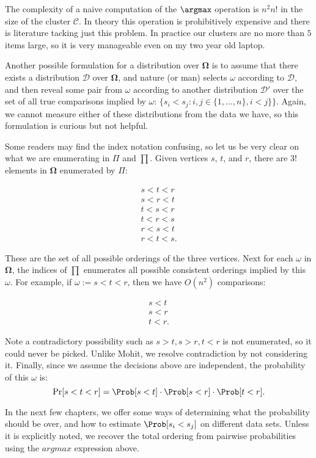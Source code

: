 \begin{remark}
The complexity of a naive computation of the $\argmax$ operation is $n^2 n!$ in the size of the cluster $\mathcal{C}.$ In theory this operation is prohibitively expensive and there is literature tacking just this problem. In practice our clusters are no more than $5$ items large, so it is very manageable even on my two year old laptop. 
\end{remark}

\begin{remark}
Another possible formulation for a distribution over $\pmb{\Omega}$ is to assume that there exists a distribution $\mathcal{D}$ over $\pmb{\Omega}$, and nature (or man) selects $\omega$ according to $\mathcal{D}$, and then reveal some pair from $\omega$ according to another distribution $\mathcal{D}'$ over the set of all true comparisons implied by $\omega$: $\{s_i < s_j : i,j \in \{1,\ldots, n\}, i < j\}\}$. Again, we cannot measure either of these distributions from the data we have, so this formulation is curious but not helpful.
\end{remark}

\begin{remark}
Some readers may find the index notation confusing, so let us be very clear on what we are enumerating in $\Pi$ and $\prod$. Given vertices $s$, $t$, and $r$, there are $3!$ elements in $\pmb{\Omega}$ enumerated by $\Pi$:

\begin{align*}
	s < t < r \\
	s < r < t \\
	t < s < r \\
	t < r < s \\
	r < s < t \\
	r < t < s.
\end{align*}

These are the set of all possible orderings of the three vertices. Next for each $\omega$ in $\pmb{\Omega}$, the indices of $\prod$ enumerates all possible consistent orderings implied by this $\omega$. For example, if $\omega := s < t < r$, then we have $O(n^2)$ comparisons:

\begin{align*}
	s < t \\
	s < r \\
	t < r.
\end{align*}

Note a contradictory possibility such as $s > t, s > r, t < r$ is not enumerated, so it could never be picked. Unlike Mohit, we resolve contradiction by not considering it. Finally, since we assume the decisions above are independent, the probability of this $\omega$ is:
\[
	\Pr[ s < t < r] = \Prob[s < t] \cdot \Prob[s < r] \cdot \Prob [t < r].
\]
\end{remark}


In the next few chapters, we offer some ways of determining what the probability should be over, and how to estimate $\Prob[ s_i < s_j ]$ on different data sets.  Unless it is explicitly noted, we recover the total ordering from pairwise probabilities using the $argmax$ expression above.